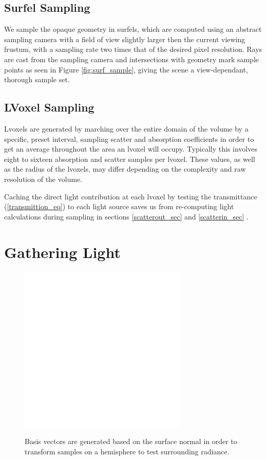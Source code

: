 \documentclass[12pt]{ucthesis}
\newcommand{\captionfonts}{\small\bf\ssp}
\begin{document}
\subsection{Surfel Sampling}

We sample the opaque geometry in surfels, which are computed using an abstract sampling camera with a field of view slightly larger then the current viewing frustum, with a sampling rate two times that of the desired pixel resolution.  Rays are cast from the sampling camera and intersections with geometry mark sample points as seen in Figure \ref{fig:surf_sample}, giving the scene a view-dependant, thorough sample set.

\subsection{LVoxel Sampling}

Lvoxels are generated by marching over the entire domain of the volume by a specific, preset interval, sampling scatter and absorption coefficients in order to get an average throughout the area an lvoxel will occupy.  Typically this involves eight to sixteen absorption and scatter samples per lvoxel.  These values, as well as the radius of the lvoxels, may differ depending on the complexity and raw resolution of the volume.

Caching the direct light contribution at each lvoxel by testing the transmittance (\ref{transmittion_eq}) to each light source saves us from re-computing light calculations during sampling in sections \ref{scatterout_sec} and \ref{scatterin_sec} \cite{signotes:2010}.

\section{Gathering Light}

\begin{figure}[h!]
    \centering
    \includegraphics[width=80mm]{img/diag/orthnormal.pdf}
    \captionfonts
    \caption{Basis vectors are generated based on the surface normal in order to transform samples on a hemisphere to test surrounding radiance.}
    \label{fig:orthonormal}
\end{figure}
\end{document}
